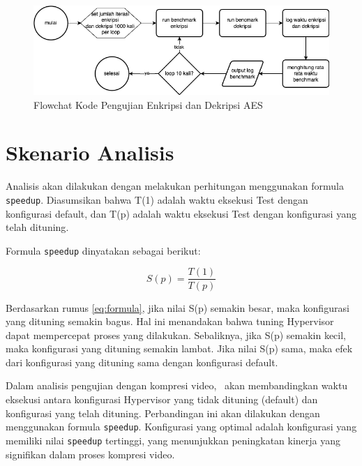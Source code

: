 \begin{figure}
    \centering
    \includegraphics[width=1\textwidth]
    {assets/pics/code-flowchart/flowchart_aes.png}
    \caption{Flowchat Kode Pengujian Enkripsi dan Dekripsi AES}
    \label{fig:flowchart_aes}
\end{figure}

\section{Skenario Analisis}
Analisis akan dilakukan dengan melakukan perhitungan menggunakan formula \texttt{speedup}. Diasumsikan bahwa T(1) adalah waktu eksekusi Test dengan konfigurasi default, dan T(p) adalah waktu eksekusi Test dengan konfigurasi yang telah dituning\cite{beuwolfCetin}.

Formula \texttt{speedup} dinyatakan sebagai berikut:

\begin{equation}
    S(p) = \frac{T(1)}{T(p)}
    \label{eq:formula}
\end{equation}

Berdasarkan rumus \ref{eq:formula}, jika nilai S(p) semakin besar, maka konfigurasi yang dituning semakin bagus. Hal ini menandakan bahwa tuning Hypervisor dapat mempercepat proses yang dilakukan. Sebaliknya, jika S(p) semakin kecil, maka konfigurasi yang dituning semakin lambat. Jika nilai S(p) sama, maka efek dari konfigurasi yang dituning sama dengan konfigurasi default.

Dalam analisis pengujian dengan kompresi video, \saya\ akan membandingkan waktu eksekusi antara konfigurasi Hypervisor yang tidak dituning (default) dan konfigurasi yang telah dituning. Perbandingan ini akan dilakukan dengan menggunakan formula \texttt{speedup}. Konfigurasi yang optimal adalah konfigurasi yang memiliki nilai \texttt{speedup} tertinggi, yang menunjukkan peningkatan kinerja yang signifikan dalam proses kompresi video.


